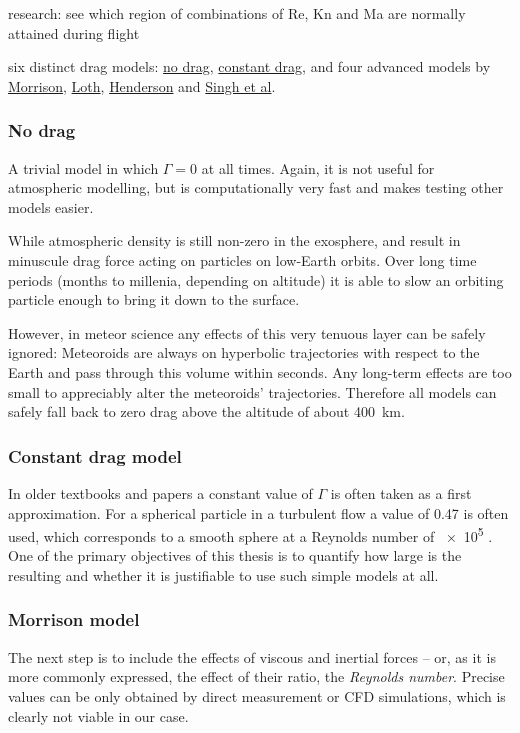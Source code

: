         research: see which region of combinations of Re, Kn and Ma are normally attained during flight

        six distinct drag models: \hyperref[fdmn]{no drag}, \hyperref[fdmc]{constant drag}, and four advanced
        models by \hyperref[fdmM]{Morrison}, \hyperref[fdmL]{Loth}, \hyperref[fdmH]{Henderson} and \hyperref[fdmS]{Singh et al}.

        \subsubsection{No drag} \label{fdmn}
            A trivial model in which $\Gamma = 0$ at all times.
            Again, it is not useful for atmospheric modelling, but is computationally
            very fast and makes testing other models easier.

            While atmospheric density is still non-zero in the exosphere,
            and result in minuscule drag force acting on particles on low-Earth orbits.
            Over long time periods (months to millenia, depending on altitude) it is able to slow
            an orbiting particle enough to bring it down to the surface.

            However, in meteor science any effects of this very tenuous layer can be safely ignored:
            Meteoroids are always on hyperbolic trajectories with respect to the Earth
            and pass through this volume within seconds. Any long-term effects
            are too small to appreciably alter the meteoroids' trajectories.
            Therefore all models can safely fall back to zero drag above the
            altitude of about \SI{400}{\kilo\metre}.

        \subsubsection{Constant drag model} \label{fdmc}
            In older textbooks and papers a constant value of $\Gamma$ is often taken as a first approximation.
            For a spherical particle in a turbulent flow a value of \num{0.47} is often used,
            which corresponds to a smooth sphere at a Reynolds number of \num{e5} \cite{???}.
            One of the primary objectives of this thesis is to quantify how large is the resulting
            and whether it is justifiable to use such simple models at all.

        \subsubsection{Morrison model} \label{fdmM}
            The next step is to include the effects of viscous and inertial forces -- or,
            as it is more commonly expressed, the effect of their ratio, the \emph{Reynolds number}.
            Precise values can be only obtained by direct measurement or CFD simulations,
            which is clearly not viable in our case.

